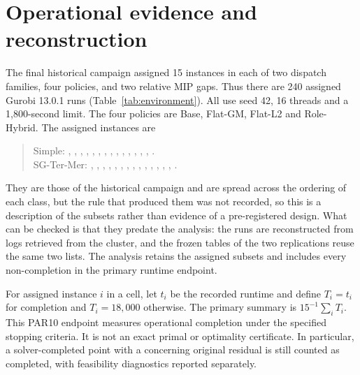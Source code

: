 \documentclass[11pt]{article}
\begin{document}
\section{Operational evidence and reconstruction}
The final historical campaign assigned 15 instances in each of two dispatch families,
four policies, and two relative MIP gaps. Thus there are 240 assigned Gurobi 13.0.1 runs (Table~\ref{tab:environment}).
All use seed 42, 16 threads and a 1,800-second limit. The four policies are Base,
Flat-GM, Flat-L2 and Role-Hybrid. The assigned instances are

\begin{quote}\small\raggedright
Simple: , , , , , , , , , , , , , , .\\[2pt]
SG-Ter-Mer: , , , , , , , , , , , , , , .
\end{quote}

\noindent They are those of the historical campaign and are spread across the ordering of each
class, but the rule that produced them was not recorded, so this is a description of the subsets
rather than evidence of a pre-registered design. What can be checked is that they predate the
analysis: the runs are reconstructed from logs retrieved from the cluster, and the frozen tables
of the two replications reuse the same two lists. The analysis retains the assigned subsets and
includes every non-completion in the primary runtime endpoint.

For assigned instance $i$ in a cell, let $t_i$ be the recorded runtime and define
$T_i=t_i$ for completion and $T_i=18{,}000$ otherwise. The primary summary is
$15^{-1}\sum_i T_i$. This PAR10 endpoint measures operational completion under
the specified stopping criteria. It is not an exact primal or optimality certificate.
In particular, a solver-completed point with a concerning original residual is still
counted as completed, with feasibility diagnostics reported separately.
\end{document}
